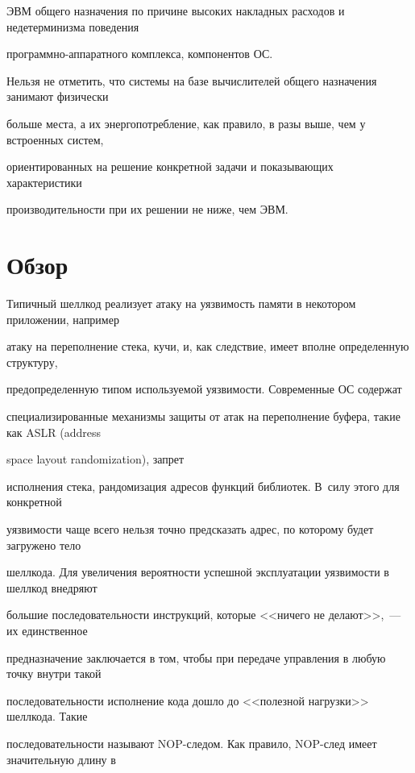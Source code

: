 ЭВМ общего назначения по причине высоких накладных расходов и недетерминизма поведения 


про\-грам\-мно-ап\-па\-рат\-но\-го комплекса, компонентов ОС. 





Нельзя не отметить, что системы на базе вычислителей общего назначения занимают физически 


больше места, а их энергопотребление, как правило, в разы выше, чем у встроенных систем, 


ориентированных на решение конкретной задачи и показывающих характеристики 


производительности при их решении не ниже, чем ЭВМ.





\section{Обзор}





Типичный шеллкод реализует атаку на уязвимость памяти в некотором приложении, например 


атаку на переполнение стека, кучи, и, как следствие, имеет вполне определенную структуру, 


предопределенную типом используемой уязвимости. Современные ОС содержат 


специализированные механизмы защиты от атак на переполнение буфера, такие как ASLR (address


space layout randomization), запрет 


исполнения стека, рандомизация адресов функций библиотек. В~силу этого для конкретной 


уязвимости чаще всего нельзя точно предсказать адрес, по которому будет загружено тело 


шеллкода. Для увеличения вероятности успешной эксплуатации уязвимости в шеллкод внедряют 


большие последовательности инструкций, которые <<ничего не делают>>,~--- их единственное 


предназначение заключается в том, чтобы при передаче управления в любую точку внутри такой 


последовательности исполнение кода дошло до <<полезной нагрузки>> шеллкода. Такие 


последовательности называют NOP-сле\-дом. Как правило, NOP-след имеет значительную длину в 


